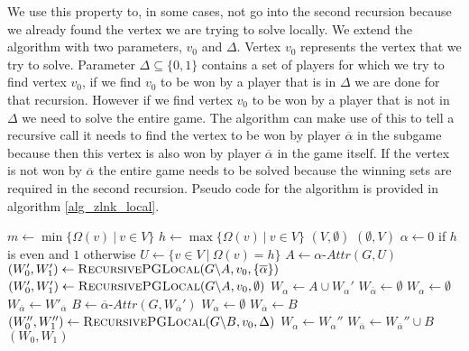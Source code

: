We use this property to, in some cases, not go into the second recursion because we already found the vertex we are trying to solve locally. We extend the algorithm with two parameters, $v_0$ and $\Delta$. Vertex $v_0$ represents the vertex that we try to solve. Parameter $\Delta \subseteq \{0,1\}$ contains a set of players for which we try to find vertex $v_0$, if we find $v_0$ to be won by a player that is in $\Delta$ we are done for that recursion. However if we find vertex $v_0$ to be won by a player that is not in $\Delta$ we need to solve the entire game. The algorithm can make use of this to tell a recursive call it needs to find the vertex to be won by player $\overline{\alpha}$ in the subgame because then this vertex is also won by player $\overline{\alpha}$ in the game itself. If the vertex is not won by $\overline{\alpha}$ the entire game needs to be solved because the winning sets are required in the second recursion. Pseudo code for the algorithm is provided in algorithm \ref{alg_zlnk_local}.
\begin{algorithm}
	\caption{$\textsc{RecursivePGLocal}(\textit{PG } G = (V,V_0,V_1, E, \Omega),v_0,\Delta)$}
	\label{alg_zlnk_local}
	\begin{algorithmic}[1]
		\State $m \gets \min\{ \Omega(v)\ |\ v \in V\}$
		\State $h \gets\max\{ \Omega(v)\ |\ v \in V\}$
		\State \Return $(V,\emptyset)$
		\Else
		\State \Return $(\emptyset, V)$
		\EndIf
		\EndIf
		\State $\alpha \gets 0$ if $h$ is even and $1$ otherwise
		\State $U \gets \{v \in V\ |\ \Omega(v) = h\}$
		\State $A \gets \alpha\textit{-Attr}(G, U)$
		\If{$\overline{\alpha} \in \Delta$}
		\State $(W_0', W_1') \gets \textsc{RecursivePGLocal}(G \backslash A,v_0,\{\overline{\alpha}\})$
		\Else
		\State $(W_0', W_1') \gets \textsc{RecursivePGLocal}(G \backslash A,v_0,\emptyset)$
		\EndIf
		\State $W_\alpha \gets A \cup W_\alpha'$
		\State $W_{\overline{\alpha}} \gets \emptyset$
		\Else
		\State $W_\alpha \gets \emptyset$
		\State $W_{\overline{\alpha}} \gets W'_{\overline{\alpha}}$
		\Else
		\State $B \gets \overline{\alpha}\textit{-Attr}(G,W_{\overline{\alpha}}')$
		\State $W_\alpha \gets \emptyset$
		\State $W_{\overline{\alpha}} \gets B$
		\Else
		\State $(W_0'', W_1'') \gets \textsc{RecursivePGLocal}(G \backslash B,v_0,\Delta)$
		\State $W_\alpha \gets W_\alpha''$
		\State $W_{\overline{\alpha}} \gets W_{\overline{\alpha}}'' \cup B$
		\EndIf
		\EndIf
		\EndIf
		\State \Return $(W_0, W_1)$
	\end{algorithmic}
\end{algorithm}

